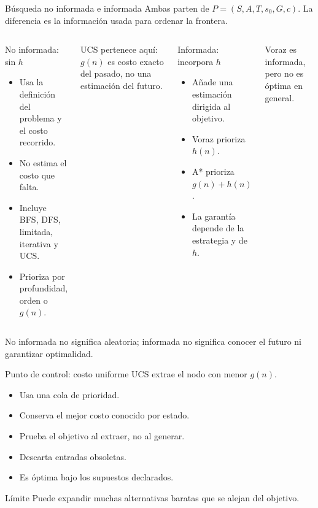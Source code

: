 \documentclass[aspectratio=169,11pt]{beamer}
\begin{document}
\begin{frame}{Búsqueda no informada e informada}
  \small
  Ambas parten de $P=(S,A,T,s_0,G,c)$. La diferencia es la información usada para ordenar la frontera.
  \vspace{.4em}
  \begin{columns}[T]
      \begin{block}{No informada: sin $h$}
        \begin{itemize}
          \item Usa la definición del problema y el costo recorrido.
          \item No estima el costo que falta.
          \item Incluye BFS, DFS, limitada, iterativa y UCS.
          \item Prioriza por profundidad, orden o $g(n)$.
        \end{itemize}
      \end{block}
      {\scriptsize UCS pertenece aquí: $g(n)$ es costo exacto del pasado, no una estimación del futuro.}
      \begin{block}{Informada: incorpora $h$}
        \begin{itemize}
          \item Añade una estimación dirigida al objetivo.
          \item Voraz prioriza $h(n)$.
          \item A* prioriza $g(n)+h(n)$.
          \item La garantía depende de la estrategia y de $h$.
        \end{itemize}
      \end{block}
      {\scriptsize Voraz es informada, pero no es óptima en general.}
  \end{columns}
  \vfill
  \alert{No informada no significa aleatoria; informada no significa conocer el futuro ni garantizar optimalidad.}
\end{frame}

\begin{frame}{Punto de control: costo uniforme}
  UCS extrae el nodo con menor $g(n)$.
  \begin{itemize}
    \item Usa una cola de prioridad.
    \item Conserva el mejor costo conocido por estado.
    \item Prueba el objetivo al extraer, no al generar.
    \item Descarta entradas obsoletas.
    \item Es óptima bajo los supuestos declarados.
  \end{itemize}
  \begin{alertblock}{Límite}
    Puede expandir muchas alternativas baratas que se alejan del objetivo.
  \end{alertblock}
\end{frame}
\end{document}

